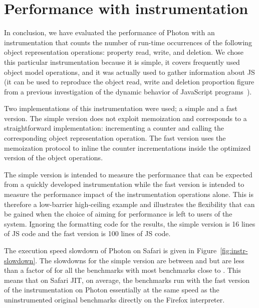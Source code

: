\FloatBarrier


\section{Performance with instrumentation}


In conclusion, we have evaluated the performance of Photon with an
instrumentation that counts the number of run-time occurrences of the following
object representation operations: property read, write, and deletion. We chose
this particular instrumentation because it is simple, it covers frequently used
object model operations, and it was actually used to gather information about
JS (it can be used to reproduce the object read, write and deletion proportion
figure from a previous investigation of the dynamic behavior of JavaScript
programs~\cite{behavior_js}).

Two implementations of this instrumentation were used; a simple and a
fast version.  The simple version does not exploit memoization and
corresponds to a straightforward implementation: incrementing a
counter and calling the corresponding object representation
operation. The fast version uses the memoization protocol to inline
the counter incrementations inside the optimized version of the object
operations.

The simple version is intended to measure the performance that can be expected
from a quickly developed instrumentation while the fast version is intended to
measure the performance impact of the instrumentation operations alone. This is
therefore a low-barrier high-ceiling example and illustrates the flexibility
that can be gained when the choice of aiming for performance is left to users
of the system.  Ignoring the formatting code for the results, the simple
version is 16 lines of JS code and the fast version is 100 lines of JS code.

The execution speed slowdown of Photon on Safari is given in
Figure~\ref{fig:instr-slowdown}. The slowdowns for the simple version are
between  and  but are less than a factor of  for
all the benchmarks with most benchmarks close to . This means that on
Safari JIT, on average, the benchmarks run with the fast version of the
instrumentation on Photon essentially at the same speed as the uninstrumented
original benchmarks directly on the Firefox interpreter.

